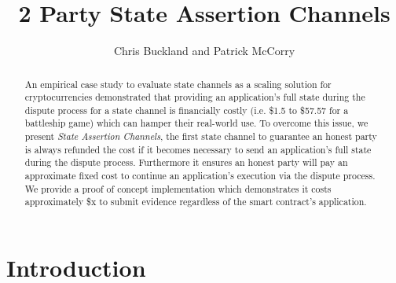 \documentclass{llncs}
\begin{document}
	\title{2 Party State Assertion Channels } 
	
	\author{Chris Buckland and Patrick McCorry}
	
	
	
	\maketitle
	\begin{abstract}
	An empirical case study to evaluate state channels as a scaling solution for cryptocurrencies demonstrated that providing an application's full state during the dispute process for a state channel is financially costly (i.e. \$1.5 to \$57.57 for a battleship game) which can hamper their real-world use. 
	To overcome this issue, we present \emph{State Assertion Channels}, the first state channel to guarantee  an honest party is always refunded the cost if it becomes necessary to send an application's full state during the dispute process. 
	Furthermore it ensures an honest party will pay an approximate fixed cost to continue an application's execution via the dispute process. 
	We provide a proof of concept implementation which demonstrates it costs approximately \$x to submit evidence  regardless of the smart contract's application. 

	\end{abstract} 

\section{Introduction}
\end{document}

